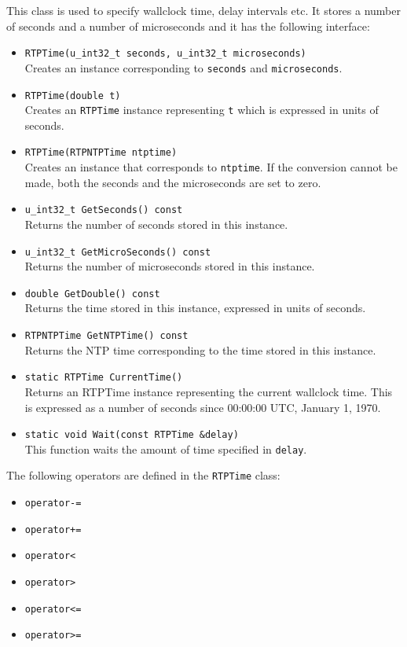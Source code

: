 \documentclass[12pt,a4paper]{article}
\begin{document}
					This class is used to specify wallclock time, delay intervals
					etc. It stores a number of seconds and a number of microseconds and
					it has the following interface:
					\begin{itemize}
						\item {\tt RTPTime(u\_int32\_t seconds, u\_int32\_t microseconds)}\\
							Creates an instance corresponding to {\tt seconds} and
							{\tt microseconds}.
						\item {\tt RTPTime(double t)}\\
							Creates an {\tt RTPTime} instance representing {\tt t} which
							is expressed in units of seconds.
						\item {\tt RTPTime(RTPNTPTime ntptime)}\\
							Creates an instance that corresponds to {\tt ntptime}. If
							the conversion cannot be made, both the seconds and the
							microseconds are set to zero.
						\item {\tt u\_int32\_t GetSeconds() const}\\
							Returns the number of seconds stored in this instance.
						\item {\tt u\_int32\_t GetMicroSeconds() const}\\
							Returns the number of microseconds stored in this instance.
						\item {\tt double GetDouble() const}\\
							Returns the time stored in this instance, expressed in
							units of seconds.
						\item {\tt RTPNTPTime GetNTPTime() const}\\
							Returns the NTP time corresponding to the time stored in
							this instance.
						\item {\tt static RTPTime CurrentTime()}\\
							Returns an RTPTime instance representing the current
							wallclock time. This is expressed as a number of seconds
							since 00:00:00 UTC, January 1, 1970.
						\item {\tt static void Wait(const RTPTime \&delay)}\\
							This function waits the amount of time specified in
							{\tt delay}.
					\end{itemize}

					The following operators are defined in the {\tt RTPTime} class:
					\begin{itemize}
						\item {\tt operator-=}
						\item {\tt operator+=}
						\item {\tt operator<}
						\item {\tt operator>}
						\item {\tt operator<=}
						\item {\tt operator>=}
					\end{itemize}
\end{document}
